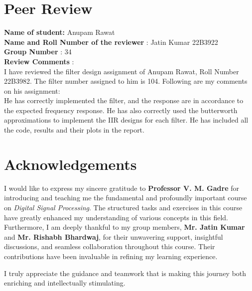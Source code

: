 \documentclass{article}
\begin{document}
\section{Peer Review}
\textbf{Name of student:} Anupam Rawat\\
\textbf{Name and Roll Number of the reviewer} : Jatin Kumar 22B3922\\
\textbf{Group Number} : 34\\
\textbf{Review Comments} :\\
I have reviewed the filter design assignment of Anupam Rawat, Roll Number 22B3982. The filter number assigned to him is 104. Following are my comments on his
assignment:\\
He has correctly implemented the filter, and the response are in accordance to the expected frequency response. He has also correctly used the butterworth approximations to
implement the IIR designs for each filter. He has included all the code, results and their plots in the report.\\

\section*{Acknowledgements}

I would like to express my sincere gratitude to \textbf{Professor V. M. Gadre} for introducing and teaching me the fundamental and profoundly important course on \textit{Digital Signal Processing}. The structured tasks and exercises in this course have greatly enhanced my understanding of various concepts in this field.
\\
Furthermore, I am deeply thankful to my group members, \textbf{Mr. Jatin Kumar} and \textbf{Mr. Rishabh Bhardwaj}, for their unwavering support, insightful discussions, and seamless collaboration throughout this course. Their contributions have been invaluable in refining my learning experience.

\noindent I truly appreciate the guidance and teamwork that is making this journey both enriching and intellectually stimulating.
\end{document}
